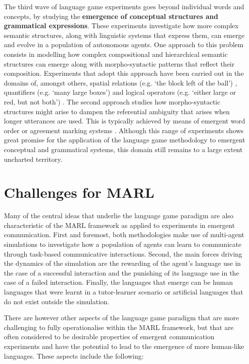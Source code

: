 \documentclass[a4paper,abstract]{scrartcl}
\begin{document}
The third wave of language game experiments goes beyond individual words and concepts, by studying the \textbf{emergence of conceptual structures and grammatical expressions}. These experiments investigate how more complex semantic structures, along with linguistic systems that express them, can emerge and evolve in a population of autonomous agents. One approach to this problem consists in modelling how complex compositional and hierarchical semantic structures can emerge along with morpho-syntactic patterns that reflect their composition. Experiments that adopt this approach have been carried out in the domains of, amongst others, spatial relations (e.g. `the block left of the ball') \citep{spranger2016evolution}, quantifiers (e.g. `many large boxes') \citep{pauw2016embodied} and logical operators (e.g. `either large or red, but not both') \citep{sierra2018agent}. The second approach studies how morpho-syntactic structures might arise to dampen the referential ambiguity that arises when longer utterances are used. This is typically achieved by means of emergent word order \citep{steels2015ambiguity,vaneecke2018generalisation} or agreement marking systems \citep{beuls2011simulating,beuls2013agent,vantrijp2016evolution,lestrade2016emergence}. Although this range of experiments shows great promise for the application of the language game methodology to emergent conceptual and grammatical systems, this domain still remains to a large extent uncharted territory. 

\section{Challenges for MARL}

Many of the central ideas that underlie the language game paradigm are also characteristic of the MARL framework as applied to experiments in emergent communication. First and foremost, both methodologies make use of multi-agent simulations to investigate how a population of agents can learn to communicate through task-based communicative interactions. Second, the main forces driving the dynamics of the simulation are the rewarding of the agent's language use in  the case of a successful interaction and the punishing of its language use in the case of a failed interaction. Finally, the languages that emerge can be human languages that were learnt in a tutor-learner scenario or artificial languages that do not exist outside the simulation. 

There are however other aspects of the language game paradigm that are more challenging to fully operationalise within the MARL framework, but that are often considered to be desirable properties of emergent communication experiments and have the potential to lead to the emergence of more human-like languages. These aspects include the following:
\end{document}
